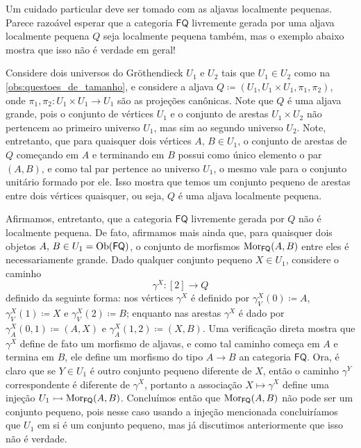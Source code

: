 \begin{obs}
    Um cuidado particular deve ser tomado com as aljavas localmente pequenas.
    Parece razoável esperar que a categoria $\mathsf{FQ}$ livremente gerada por uma aljava localmente pequena $Q$ seja localmente pequena também, mas o exemplo abaixo mostra que isso não é verdade em geral!
\end{obs}

\begin{exem}
    Considere dois universos do Gröthendieck $U_1$ e $U_2$ tais que $U_1 \in U_2$ como na \cref{obs:questoes_de_tamanho}, e considere a aljava $Q \coloneqq (U_1,U_1 \times U_1, \pi_1,\pi_2)$, onde $\pi_1,\pi_2: U_1 \times U_1 \to U_1$ são as projeções canônicas.
    Note que $Q$ é uma aljava grande, pois o conjunto de vértices $U_1$ e o conjunto de arestas $U_1 \times U_2$ não pertencem ao primeiro universo $U_1$, mas sim ao segundo universo $U_2$.
    Note, entretanto, que para quaisquer dois vértices $A,\, B \in U_1$, o conjunto de arestas de $Q$ começando em $A$ e terminando em $B$ possui como único elemento o par $(A,B)$, e como tal par pertence ao universo $U_1$, o mesmo vale para o conjunto unitário formado por ele.
    Isso mostra que temos um conjunto pequeno de arestas entre dois vértices quaisquer, ou seja, $Q$ é uma aljava localmente pequena.

    Afirmamos, entretanto, que a categoria $\mathsf{FQ}$ livremente gerada por $Q$ não é localmente pequena.
    De fato, afirmamos mais ainda que, para quaisquer dois objetos $A,\, B \in U_1 = \mathrm{Ob}(\mathsf{FQ})$, o conjunto de morfismos $\mathrm{Mor}_{\mathsf{FQ}}(A,B)$ entre eles é necessariamente grande.
    Dado qualquer conjunto pequeno $X \in U_1$, considere o caminho
    \begin{displaymath}
        \gamma^X: [2] \to Q
    \end{displaymath}
    definido da seguinte forma: nos vértices $\gamma^X$ é definido por $\gamma^X_V(0) \coloneqq A$, $\gamma^X_V(1) \coloneqq X$ e $\gamma^X_V(2) \coloneqq B$; enquanto nas arestas $\gamma^X$ é dado por $\gamma^X_A(0,1) \coloneqq (A,X)$ e $\gamma^X_A(1,2) \coloneqq (X,B)$.
    Uma verificação direta mostra que $\gamma^X$ define de fato um morfismo de aljavas, e como tal caminho começa em $A$ e termina em $B$, ele define um morfismo do tipo $A \to B$ an categoria $\mathsf{FQ}$.
    Ora, é claro que se $Y \in U_1$ é outro conjunto pequeno diferente de $X$, então o caminho $\gamma^Y$ correspondente é diferente de $\gamma^X$, portanto a associação $X \mapsto \gamma^X$ define uma injeção $U_1 \rightarrowtail \mathrm{Mor}_{\mathsf{FQ}}(A,B)$.
    Concluímos então que $\mathrm{Mor}_{\mathsf{FQ}}(A,B)$ não pode ser um conjunto pequeno, pois nesse caso usando a injeção mencionada concluiríamos que $U_1$ em si é um conjunto pequeno, mas já discutimos anteriormente que isso não é verdade.
\end{exem}

